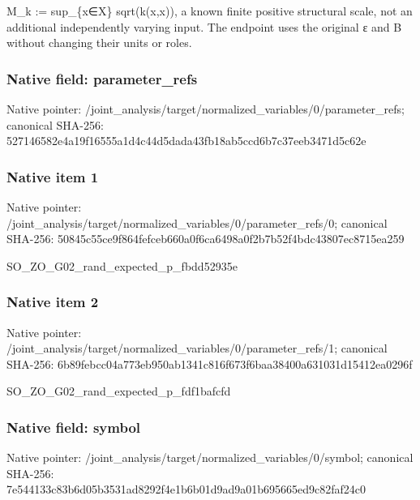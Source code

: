 \documentclass[10pt,a4paper]{article}
\begin{document}
\begingroup\raggedright\sloppy M\_\allowbreak{}k :\allowbreak{}=\allowbreak{} sup\_\allowbreak{}\{x{\AtlasUnicodeSymbols ∈}\allowbreak{}X\} sqrt(k(x,\allowbreak{}x)),\allowbreak{} a known finite positive structural scale,\allowbreak{} not an additional independently varying input. The endpoint uses the original {\AtlasUnicodeText ε}\allowbreak{} and B without changing their units or roles.\par\endgroup

\subsubsection{Native field: parameter\_\allowbreak{}refs}
Native pointer: /joint\_\allowbreak{}analysis/target/normalized\_\allowbreak{}variables/0/parameter\_\allowbreak{}refs; canonical SHA-256: 527146582e4a19f16555a1d4c44d5dada43fb18ab5ccd6b7c37eeb3471d5c62e

\subsubsection{Native item 1}
Native pointer: /joint\_\allowbreak{}analysis/target/normalized\_\allowbreak{}variables/0/parameter\_\allowbreak{}refs/0; canonical SHA-256: 50845c55ce9f864fefceb660a0f6ca6498a0f2b7b52f4bdc43807ec8715ea259

\begingroup\raggedright\sloppy SO\_\allowbreak{}ZO\_\allowbreak{}G02\_\allowbreak{}rand\_\allowbreak{}expected\_\allowbreak{}p\_\allowbreak{}fbdd52935e\par\endgroup

\subsubsection{Native item 2}
Native pointer: /joint\_\allowbreak{}analysis/target/normalized\_\allowbreak{}variables/0/parameter\_\allowbreak{}refs/1; canonical SHA-256: 6b89febcc04a773eb950ab1341c816f673f6baa38400a631031d15412ea0296f

\begingroup\raggedright\sloppy SO\_\allowbreak{}ZO\_\allowbreak{}G02\_\allowbreak{}rand\_\allowbreak{}expected\_\allowbreak{}p\_\allowbreak{}fdf1bafcfd\par\endgroup

\subsubsection{Native field: symbol}
Native pointer: /joint\_\allowbreak{}analysis/target/normalized\_\allowbreak{}variables/0/symbol; canonical SHA-256: 7e544133c83b6d05b3531ad8292f4e1b6b01d9ad9a01b695665ed9c82faf24c0
\end{document}
